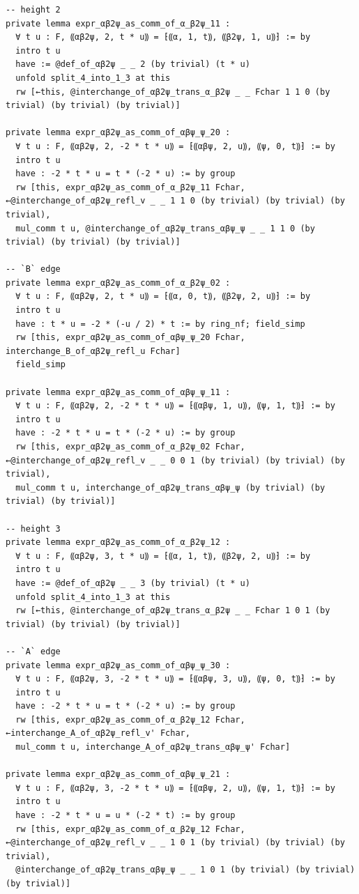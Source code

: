 \begin{Verbatim}
-- height 2
private lemma expr_αβ2ψ_as_comm_of_α_β2ψ_11 :
  ∀ t u : F, ⸨αβ2ψ, 2, t * u⸩ = ⁅⸨α, 1, t⸩, ⸨β2ψ, 1, u⸩⁆ := by
  intro t u
  have := @def_of_αβ2ψ _ _ 2 (by trivial) (t * u)
  unfold split_4_into_1_3 at this
  rw [←this, @interchange_of_αβ2ψ_trans_α_β2ψ _ _ Fchar 1 1 0 (by trivial) (by trivial) (by trivial)]

private lemma expr_αβ2ψ_as_comm_of_αβψ_ψ_20 :
  ∀ t u : F, ⸨αβ2ψ, 2, -2 * t * u⸩ = ⁅⸨αβψ, 2, u⸩, ⸨ψ, 0, t⸩⁆ := by
  intro t u
  have : -2 * t * u = t * (-2 * u) := by group
  rw [this, expr_αβ2ψ_as_comm_of_α_β2ψ_11 Fchar, ←@interchange_of_αβ2ψ_refl_v _ _ 1 1 0 (by trivial) (by trivial) (by trivial),
  mul_comm t u, @interchange_of_αβ2ψ_trans_αβψ_ψ _ _ 1 1 0 (by trivial) (by trivial) (by trivial)]

-- `B` edge
private lemma expr_αβ2ψ_as_comm_of_α_β2ψ_02 :
  ∀ t u : F, ⸨αβ2ψ, 2, t * u⸩ = ⁅⸨α, 0, t⸩, ⸨β2ψ, 2, u⸩⁆ := by
  intro t u
  have : t * u = -2 * (-u / 2) * t := by ring_nf; field_simp
  rw [this, expr_αβ2ψ_as_comm_of_αβψ_ψ_20 Fchar, interchange_B_of_αβ2ψ_refl_u Fchar]
  field_simp

private lemma expr_αβ2ψ_as_comm_of_αβψ_ψ_11 :
  ∀ t u : F, ⸨αβ2ψ, 2, -2 * t * u⸩ = ⁅⸨αβψ, 1, u⸩, ⸨ψ, 1, t⸩⁆ := by
  intro t u
  have : -2 * t * u = t * (-2 * u) := by group
  rw [this, expr_αβ2ψ_as_comm_of_α_β2ψ_02 Fchar, ←@interchange_of_αβ2ψ_refl_v _ _ 0 0 1 (by trivial) (by trivial) (by trivial),
  mul_comm t u, interchange_of_αβ2ψ_trans_αβψ_ψ (by trivial) (by trivial) (by trivial)]

-- height 3
private lemma expr_αβ2ψ_as_comm_of_α_β2ψ_12 :
  ∀ t u : F, ⸨αβ2ψ, 3, t * u⸩ = ⁅⸨α, 1, t⸩, ⸨β2ψ, 2, u⸩⁆ := by
  intro t u
  have := @def_of_αβ2ψ _ _ 3 (by trivial) (t * u)
  unfold split_4_into_1_3 at this
  rw [←this, @interchange_of_αβ2ψ_trans_α_β2ψ _ _ Fchar 1 0 1 (by trivial) (by trivial) (by trivial)]

-- `A` edge
private lemma expr_αβ2ψ_as_comm_of_αβψ_ψ_30 :
  ∀ t u : F, ⸨αβ2ψ, 3, -2 * t * u⸩ = ⁅⸨αβψ, 3, u⸩, ⸨ψ, 0, t⸩⁆ := by
  intro t u
  have : -2 * t * u = t * (-2 * u) := by group
  rw [this, expr_αβ2ψ_as_comm_of_α_β2ψ_12 Fchar, ←interchange_A_of_αβ2ψ_refl_v' Fchar,
  mul_comm t u, interchange_A_of_αβ2ψ_trans_αβψ_ψ' Fchar]

private lemma expr_αβ2ψ_as_comm_of_αβψ_ψ_21 :
  ∀ t u : F, ⸨αβ2ψ, 3, -2 * t * u⸩ = ⁅⸨αβψ, 2, u⸩, ⸨ψ, 1, t⸩⁆ := by
  intro t u
  have : -2 * t * u = u * (-2 * t) := by group
  rw [this, expr_αβ2ψ_as_comm_of_α_β2ψ_12 Fchar, ←@interchange_of_αβ2ψ_refl_v _ _ 1 0 1 (by trivial) (by trivial) (by trivial),
  @interchange_of_αβ2ψ_trans_αβψ_ψ _ _ 1 0 1 (by trivial) (by trivial) (by trivial)]


\end{Verbatim}

